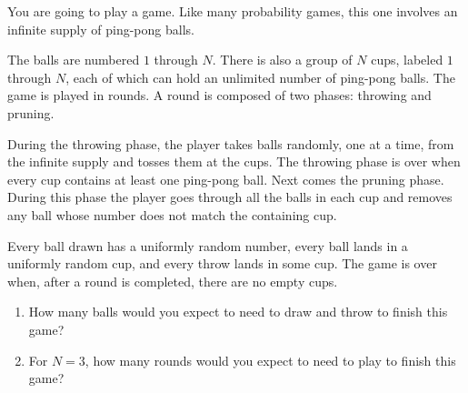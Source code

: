 \documentclass[12pt]{article}
\begin{document}
\begin{exercise}
    You are going to play a game.  Like many probability games, this one
    involves an infinite supply of ping-pong balls.

    The balls are numbered \( 1 \) through \( N \).  There is also a
    group of \( N \) cups, labeled \( 1 \) through \( N \), each of
    which can hold an unlimited number of ping-pong balls.  The game is
    played in rounds.  A round is composed of two phases:  throwing and
    pruning.

    During the throwing phase, the player takes balls randomly, one at a
    time, from the infinite supply and tosses them at the cups.  The
    throwing phase is over when every cup contains at least one
    ping-pong ball.  Next comes the pruning phase.  During this phase
    the player goes through all the balls in each cup and removes any
    ball whose number does not match the containing cup.

    Every ball drawn has a uniformly random number, every ball lands in
    a uniformly random cup, and every throw lands in some cup.  The game
    is over when, after a round is completed, there are no empty cups.

    \begin{enumerate}[label=(\alph*)]
    \item
        How many balls would you expect to need to draw and throw to
        finish this game?
    \item
        For \( N = 3 \), how many rounds would you expect to need to
        play to finish this game?
\end{enumerate}
\end{exercise}
\end{document}
